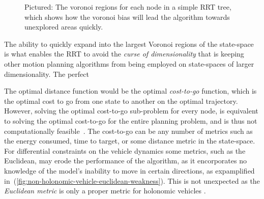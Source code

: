 \begin{figure}
  \centering {}
  \caption{Pictured: The voronoi regions for each node in a simple RRT tree,
    which shows how the voronoi bias will lead the algorithm towards unexplored
    areas quickly.}
  \label{fig:rrt-voronoi}
\end{figure}

The ability to quickly expand into the largest Voronoi regions of the
state-space is what enables the \ac{RRT} to avoid the \textit{curse of
  dimensionality} that is keeping other motion planning algorithms from being
employed on state-spaces of larger dimensionality. The perfect

The optimal distance function would be the optimal \textit{cost-to-go} function,
which is the optimal cost to go from one state to another on the optimal
trajectory. However, solving the optimal cost-to-go sub-problem for every node,
is equivalent to solving the optimal cost-to-go for the entire planning problem,
and is thus not computationally feasible~\cite{Lav06}. The cost-to-go can be any
number of metrics such as the energy consumed, time to target, or some distance
metric in the state-space. For differential constraints on the vehicle dynamics
some metrics, such as the Euclidean, may erode the performance of the algorithm,
as it encorporates no knowledge of the model's inability to move in certain
directions, as expamplified
in~(\ref{fig:non-holonomic-vehicle-euclidean-weakness}). This is not unexpected
as the \textit{Euclidean metric} is only a proper metric for holonomic vehicles
\cite{parkFeedbackMotionPlanning2015}.

